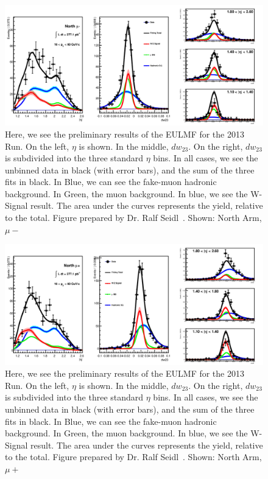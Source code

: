 \begin{figure}
  \centering
  \includegraphics[width=\linewidth]{./figures/prelim_full_maxlikefit_a1q0.jpg}
  \caption{
    Here, we see the preliminary results of the EULMF for the 2013 Run. On the
    left, $\eta$ is shown. In the middle, $dw_{23}$. On the right, $dw_{23}$ is
    subdivided into the three standard $\eta$ bins. In all cases, we see the
    unbinned data in black (with error bars), and the sum of the three fits in
    black. In Blue, we can see the fake-muon hadronic background. In Green, the
    muon background. In blue, we see the W-Signal result. The area under the
    curves represents the yield, relative to the total. Figure prepared by Dr.
    Ralf Seidl~\cite{Seidl2014a}. Shown: North Arm, $\mu-$
  }
  \label{fig:maxlikefit_a1q0}
\end{figure}

\begin{figure}
  \centering
  \includegraphics[width=\linewidth]{./figures/prelim_full_maxlikefit_a1q1.jpg}
  \caption{
    Here, we see the preliminary results of the EULMF for the 2013 Run. On the
    left, $\eta$ is shown. In the middle, $dw_{23}$. On the right, $dw_{23}$ is
    subdivided into the three standard $\eta$ bins. In all cases, we see the
    unbinned data in black (with error bars), and the sum of the three fits in
    black. In Blue, we can see the fake-muon hadronic background. In Green, the
    muon background. In blue, we see the W-Signal result. The area under the
    curves represents the yield, relative to the total. Figure prepared by Dr.
    Ralf Seidl~\cite{Seidl2014a}. Shown: North Arm, $\mu+$
  }
  \label{fig:maxlikefit_a1q1}
\end{figure}

